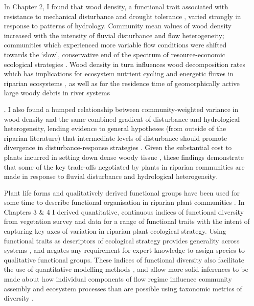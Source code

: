In Chapter 2, I found that wood density, a functional trait associated with resistance to mechanical disturbance and drought tolerance \citep{Chave2009, Niklas2010}, varied strongly in response to patterns of hydrology. Community mean values of wood density increased with the intensity of fluvial disturbance and flow heterogeneity; communities which experienced more variable flow conditions were shifted towards the ‘slow’, conservative end of the spectrum of resource-economic ecological strategies \citep{Reich2014a}. Wood density in turn influences wood decomposition rates \citep{Mori2013} which has implications for ecosystem nutrient cycling and energetic fluxes in riparian ecosystems \citep{Harmon1986}, as well as for the residence time of geomorphically active large woody debris in river systems {\citep{Gurnell2002, Cadol2010}. I also found a humped relationship between community-weighted variance in wood density and the same combined gradient of disturbance and hydrological heterogeneity, lending evidence to general hypotheses (from outside of the riparian literature) that intermediate levels of disturbance should promote divergence in disturbance-response strategies \citep{Grime2006, Sonnier2010}. Given the substantial cost to plants incurred in setting down dense woody tissue \citep{Falster2006}, these findings demonstrate that some of the key trade-offs negotiated by plants in riparian communities are made in response to fluvial disturbance and hydrological heterogeneity.
 
Plant life forms and qualitatively derived functional groups have been used for some time to describe functional organisation in riparian plant communities \citep{Brinson1993, Stromberg2010, Stromberg2013}. In Chapters 3 \& 4 I derived quantitative, continuous indices of functional diversity from vegetation survey and data for a range of functional traits with the intent of capturing key axes of variation in riparian plant ecological strategy. Using functional traits as descriptors of ecological strategy provides generality across systems \citep{Lavorel2002, Suding2008}, and negates any requirement for expert knowledge to assign species to qualitative functional groups. These indices of functional diversity also facilitate the use of quantitative modelling methods \citep{Mason2013}, and allow more solid inferences to be made about how individual components of flow regime influence community assembly and ecosystem processes than are possible using taxonomic metrics of diversity \citep{Tilman1997, Diaz1998}.

}
